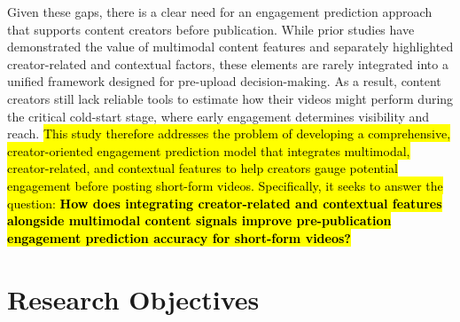 Given these gaps, there is a clear need for an engagement prediction approach that supports content creators before publication. While prior studies have demonstrated the value of multimodal content features and separately highlighted creator-related and contextual factors, these elements are rarely integrated into a unified framework designed for pre-upload decision-making. As a result, content creators still lack reliable tools to estimate how their videos might perform during the critical cold-start stage, where early engagement determines visibility and reach. \hl{This study therefore addresses the problem of developing a comprehensive, creator-oriented engagement prediction model that integrates multimodal, creator-related, and contextual features to help creators gauge potential engagement before posting short-form videos. Specifically, it seeks to answer the question: \textbf{How does integrating creator-related and contextual features alongside multimodal content signals improve pre-publication engagement prediction accuracy for short-form videos?}}


\section{Research Objectives}





